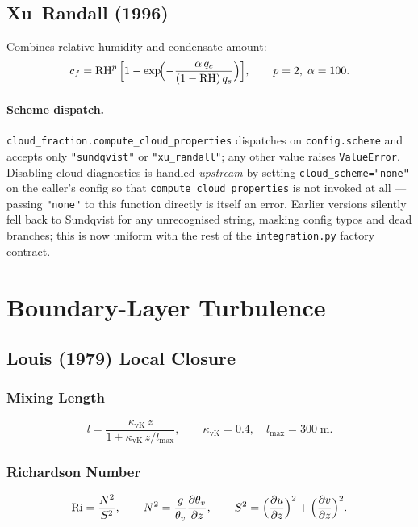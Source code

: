 \documentclass[11pt,twoside]{report}
\newcommand{\pp}{\partial}
\begin{document}
\subsection{Xu--Randall (1996)}

Combines relative humidity and condensate amount:
\begin{equation}
  c_f = \mathrm{RH}^p\,\Bigl[1-\exp\!\Bigl(
  -\frac{\alpha\,q_c}{(1-\mathrm{RH})\,q_s}\Bigr)\Bigr],
  \qquad p=2,\;\alpha=100.
\end{equation}

\paragraph{Scheme dispatch.}
\texttt{cloud\_fraction.compute\_cloud\_properties} dispatches on
\texttt{config.scheme} and accepts only \texttt{"sundqvist"} or
\texttt{"xu\_randall"}; any other value raises \texttt{ValueError}.
Disabling cloud diagnostics is handled \emph{upstream} by setting
\texttt{cloud\_scheme="none"} on the caller's config so that
\texttt{compute\_cloud\_properties} is not invoked at all --- passing
\texttt{"none"} to this function directly is itself an error.  Earlier
versions silently fell back to Sundqvist for any unrecognised string,
masking config typos and dead branches; this is now uniform with the
rest of the \texttt{integration.py} factory contract.


\section{Boundary-Layer Turbulence}
\label{sec:pbl}

\subsection{Louis (1979) Local Closure}

\subsubsection{Mixing Length}
\begin{equation}
  l = \frac{\kappa_{\mathrm{vK}}\,z}{1+\kappa_{\mathrm{vK}}\,z/l_{\max}},
  \qquad \kappa_{\mathrm{vK}}=0.4,\quad l_{\max}=300\;\text{m}.
\end{equation}

\subsubsection{Richardson Number}
\begin{equation}
  \mathrm{Ri} = \frac{N^2}{S^2}, \qquad
  N^2 = \frac{g}{\theta_v}\frac{\pp\theta_v}{\pp z}, \qquad
  S^2 = \Bigl(\frac{\pp u}{\pp z}\Bigr)^2
  +\Bigl(\frac{\pp v}{\pp z}\Bigr)^2.
\end{equation}
\end{document}

